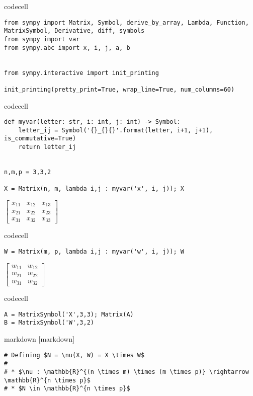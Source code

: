 codecell

\begin{verbatim}
from sympy import Matrix, Symbol, derive_by_array, Lambda, Function, MatrixSymbol, Derivative, diff, symbols
from sympy import var
from sympy.abc import x, i, j, a, b


from sympy.interactive import init_printing

init_printing(pretty_print=True, wrap_line=True, num_columns=60)
\end{verbatim}


codecell

\begin{verbatim}
def myvar(letter: str, i: int, j: int) -> Symbol:
    letter_ij = Symbol('{}_{}{}'.format(letter, i+1, j+1), is_commutative=True)
    return letter_ij


n,m,p = 3,3,2

X = Matrix(n, m, lambda i,j : myvar('x', i, j)); X
\end{verbatim}

$\displaystyle \left[\begin{matrix}x_{11} & x_{12} & x_{13}\\x_{21} & x_{22} & x_{23}\\x_{31} & x_{32} & x_{33}\end{matrix}\right]$

codecell

\begin{verbatim}
W = Matrix(m, p, lambda i,j : myvar('w', i, j)); W
\end{verbatim}

$\displaystyle \left[\begin{matrix}w_{11} & w_{12}\\w_{21} & w_{22}\\w_{31} & w_{32}\end{matrix}\right]$

codecell

\begin{verbatim}
A = MatrixSymbol('X',3,3); Matrix(A)
B = MatrixSymbol('W',3,2)
\end{verbatim}


markdown [markdown]

\begin{verbatim}
# Defining $N = \nu(X, W) = X \times W$
#
# * $\nu : \mathbb{R}^{(n \times m) \times (m \times p)} \rightarrow \mathbb{R}^{n \times p}$
# * $N \in \mathbb{R}^{n \times p}$
\end{verbatim}


